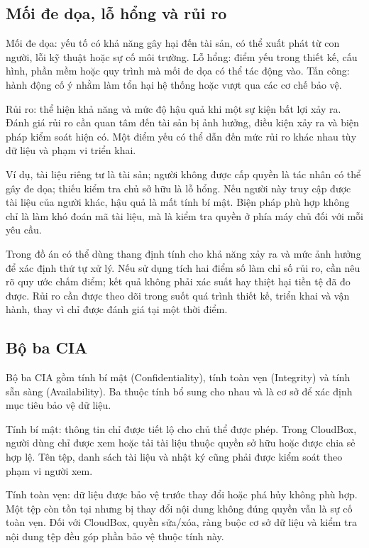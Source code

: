 \subsection{Mối đe dọa, lỗ hổng và rủi ro}
Mối đe dọa: yếu tố có khả năng gây hại đến tài sản, có thể xuất phát từ con người, lỗi kỹ thuật hoặc sự cố môi trường. Lỗ hổng: điểm yếu trong thiết kế, cấu hình, phần mềm hoặc quy trình mà mối đe dọa có thể tác động vào. Tấn công: hành động cố ý nhằm làm tổn hại hệ thống hoặc vượt qua các cơ chế bảo vệ.

Rủi ro: thể hiện khả năng và mức độ hậu quả khi một sự kiện bất lợi xảy ra. Đánh giá rủi ro cần quan tâm đến tài sản bị ảnh hưởng, điều kiện xảy ra và biện pháp kiểm soát hiện có. Một điểm yếu có thể dẫn đến mức rủi ro khác nhau tùy dữ liệu và phạm vi triển khai.

Ví dụ, tài liệu riêng tư là tài sản; người không được cấp quyền là tác nhân có thể gây đe dọa; thiếu kiểm tra chủ sở hữu là lỗ hổng. Nếu người này truy cập được tài liệu của người khác, hậu quả là mất tính bí mật. Biện pháp phù hợp không chỉ là làm khó đoán mã tài liệu, mà là kiểm tra quyền ở phía máy chủ đối với mỗi yêu cầu.

Trong đồ án có thể dùng thang định tính cho khả năng xảy ra và mức ảnh hưởng để xác định thứ tự xử lý. Nếu sử dụng tích hai điểm số làm chỉ số rủi ro, cần nêu rõ quy ước chấm điểm; kết quả không phải xác suất hay thiệt hại tiền tệ đã đo được. Rủi ro cần được theo dõi trong suốt quá trình thiết kế, triển khai và vận hành, thay vì chỉ được đánh giá tại một thời điểm.\cite[tr.~119--120]{ccsp}

\subsection{Bộ ba CIA}
Bộ ba CIA gồm tính bí mật (Confidentiality), tính toàn vẹn (Integrity) và tính sẵn sàng (Availability). Ba thuộc tính bổ sung cho nhau và là cơ sở để xác định mục tiêu bảo vệ dữ liệu.

Tính bí mật: thông tin chỉ được tiết lộ cho chủ thể được phép. Trong CloudBox, người dùng chỉ được xem hoặc tải tài liệu thuộc quyền sở hữu hoặc được chia sẻ hợp lệ. Tên tệp, danh sách tài liệu và nhật ký cũng phải được kiểm soát theo phạm vi người xem.

Tính toàn vẹn: dữ liệu được bảo vệ trước thay đổi hoặc phá hủy không phù hợp. Một tệp còn tồn tại nhưng bị thay đổi nội dung không đúng quyền vẫn là sự cố toàn vẹn. Đối với CloudBox, quyền sửa/xóa, ràng buộc cơ sở dữ liệu và kiểm tra nội dung tệp đều góp phần bảo vệ thuộc tính này.

